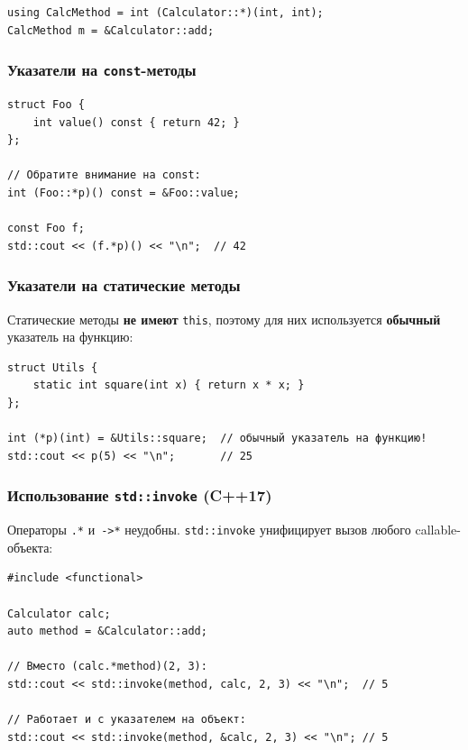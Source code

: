 \documentclass[a4paper,12pt]{article}
\begin{document}
\begin{lstlisting}
using CalcMethod = int (Calculator::*)(int, int);
CalcMethod m = &Calculator::add;
\end{lstlisting}

\subsubsection{Указатели на \texttt{const}-методы}

\begin{lstlisting}
struct Foo {
    int value() const { return 42; }
};

// Обратите внимание на const:
int (Foo::*p)() const = &Foo::value;

const Foo f;
std::cout << (f.*p)() << "\n";  // 42
\end{lstlisting}

\subsubsection{Указатели на статические методы}

Статические методы \textbf{не имеют} \texttt{this}, поэтому для них используется
\textbf{обычный} указатель на функцию:

\begin{lstlisting}
struct Utils {
    static int square(int x) { return x * x; }
};

int (*p)(int) = &Utils::square;  // обычный указатель на функцию!
std::cout << p(5) << "\n";       // 25
\end{lstlisting}

\subsubsection{Использование \texttt{std::invoke} (C++17)}

Операторы \texttt{.*} и~\texttt{->*} неудобны. \texttt{std::invoke}
унифицирует вызов любого callable-объекта:

\begin{lstlisting}
#include <functional>

Calculator calc;
auto method = &Calculator::add;

// Вместо (calc.*method)(2, 3):
std::cout << std::invoke(method, calc, 2, 3) << "\n";  // 5

// Работает и с указателем на объект:
std::cout << std::invoke(method, &calc, 2, 3) << "\n"; // 5
\end{lstlisting}
\end{document}
